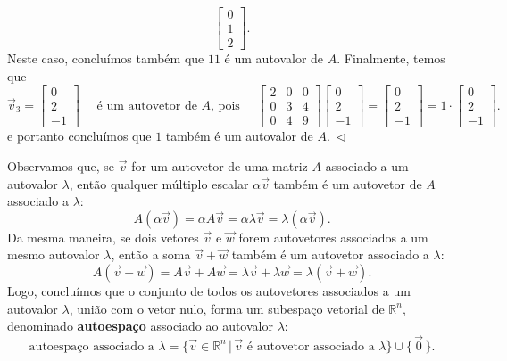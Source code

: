 \begin{ex}
\begin{equation}
{	\begin{bmatrix}
	0 \\
	1 \\
	2
	\end{bmatrix}}.
	\end{equation} Neste caso, concluímos também que $11$ é um autovalor de $A.$
	Finalmente, temos que 
	\begin{equation}
	\vec{v}_3 =
	{\begin{bmatrix}
	0 \\
	2 \\
	-1
	\end{bmatrix}} \quad \text{ é um autovetor de $A$, pois } \quad {
	\begin{bmatrix}
	2 & 0 & 0 \\
	0 & 3 & 4 \\
	0 & 4 & 9
	\end{bmatrix}} {
	\begin{bmatrix}
	0 \\
	2 \\
	-1
	\end{bmatrix}} = {
	\begin{bmatrix}
	0 \\
	2 \\
	-1
	\end{bmatrix}} = 1 \cdot {
	\begin{bmatrix}
	0 \\
	2 \\
	-1
	\end{bmatrix}}.
	\end{equation} e portanto concluímos que $1$ também é  um autovalor de $A. \ \lhd$

\end{ex}


Observamos que, se $\vec{v}$ for um autovetor de uma matriz $A$ associado a um autovalor $\lambda$, então qualquer múltiplo escalar $\alpha \vec{v}$ também é um autovetor de $A$ associado a $\lambda$:
\begin{equation}
A (\alpha \vec{v}) = \alpha A \vec{v} = \alpha \lambda \vec{v} = \lambda (\alpha \vec{v}).
\end{equation} Da mesma maneira, se dois vetores $\vec{v}$ e $\vec{w}$ forem autovetores associados a um mesmo autovalor $\lambda$, então a soma $\vec{v} + \vec{w}$ também é um autovetor associado a $\lambda$:
\begin{equation}
A (\vec{v} + \vec{w}) = A \vec{v} + A \vec{w} =  \lambda \vec{v} + \lambda \vec{w} = \lambda (\vec{v} + \vec{w}).
\end{equation} Logo, concluímos que o conjunto de todos os autovetores associados a um autovalor $\lambda$, união com o vetor nulo, forma um subespaço vetorial de $\mathbb{R}^n$, denominado \textbf{autoespaço} associado ao autovalor $\lambda$:
\begin{equation}
\text{autoespaço associado a } \lambda = \big\{ \vec{v} \in \mathbb{R}^n \, | \, \vec{v} \text{ é autovetor associado a } \lambda \big\} \cup \{\, \vec{0}\, \}.
\end{equation}

